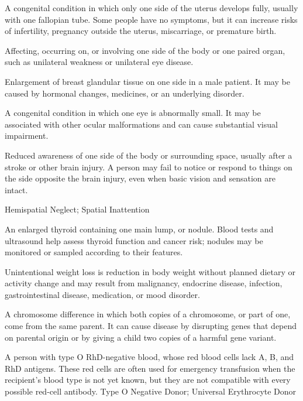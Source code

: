  A congenital condition in which only one side of the uterus develops fully, usually with one fallopian tube. Some people have no symptoms, but it can increase risks of infertility, pregnancy outside the uterus, miscarriage, or premature birth.

 Affecting, occurring on, or involving one side of the body or one paired organ, such as unilateral weakness or unilateral eye disease.

 Enlargement of breast glandular tissue on one side in a male patient. It may be caused by hormonal changes, medicines, or an underlying disorder.

 A congenital condition in which one eye is abnormally small. It may be associated with other ocular malformations and can cause substantial visual impairment.

 Reduced awareness of one side of the body or surrounding space, usually after a stroke or other brain injury. A person may fail to notice or respond to things on the side opposite the brain injury, even when basic vision and sensation are intact.

\synonyms
Hemispatial Neglect; Spatial Inattention

 An enlarged thyroid containing one main lump, or nodule. Blood tests and ultrasound help assess thyroid function and cancer risk; nodules may be monitored or sampled according to their features.

 Unintentional weight loss is reduction in body weight without planned dietary or activity change and may result from malignancy, endocrine disease, infection, gastrointestinal disease, medication, or mood disorder.

 A chromosome difference in which both copies of a chromosome, or part of one, come from the same parent. It can cause disease by disrupting genes that depend on parental origin or by giving a child two copies of a harmful gene variant.

 A person with type O RhD-negative blood, whose red blood cells lack A, B, and RhD antigens. These red cells are often used for emergency transfusion when the recipient’s blood type is not yet known, but they are not compatible with every possible red-cell antibody.
\synonyms
Type O Negative Donor; Universal Erythrocyte Donor

